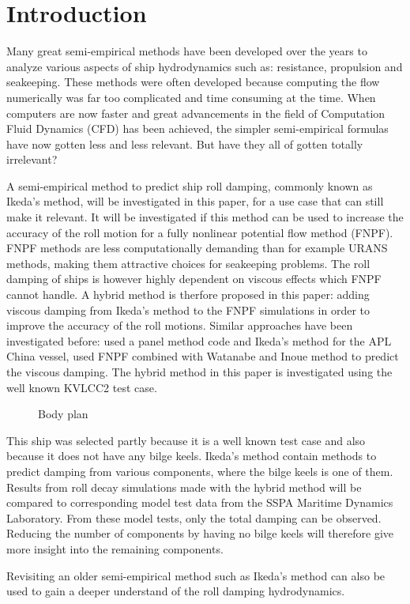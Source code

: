 \section{Introduction}\label{introduction}

Many great semi-empirical methods have been developed over the years to
analyze various aspects of ship hydrodynamics such as: resistance,
propulsion and seakeeping. These methods were often developed because
computing the flow numerically was far too complicated and time
consuming at the time. When computers are now faster and great
advancements in the field of Computation Fluid Dynamics (CFD) has been
achieved, the simpler semi-empirical formulas have now gotten less and
less relevant. But have they all of gotten totally irrelevant?

A semi-empirical method to predict ship roll damping, commonly known as
Ikeda's method, will be investigated in this paper, for a use case that
can still make it relevant. It will be investigated if this method can
be used to increase the accuracy of the roll motion for a fully
nonlinear potential flow method (FNPF). FNPF methods are less
computationally demanding than for example URANS methods, making them
attractive choices for seakeeping problems. The roll damping of ships is
however highly dependent on viscous effects which FNPF cannot handle. A
hybrid method is therfore proposed in this paper: adding viscous damping
from Ikeda's method to the FNPF simulations in order to improve the
accuracy of the roll motions. Similar approaches have been investigated
before: \cite{7505983/UGK6YEVD} used a panel method code and Ikeda's
method for the APL China vessel, \cite{7505983/24TNAV5Z} used FNPF
combined with Watanabe and Inoue method to predict the viscous damping.
The hybrid method in this paper is investigated using the well known
KVLCC2 test case.
 
            
    
    \begin{figure}
        \begin{center}\end{center}
        \caption{Body plan}
        \label{fig:body_plan}
    \end{figure}
    

    This ship was selected partly because it is a well known test case and
also because it does not have any bilge keels. Ikeda's method contain
methods to predict damping from various components, where the bilge
keels is one of them. Results from roll decay simulations made with the
hybrid method will be compared to corresponding model test data from the
SSPA Maritime Dynamics Laboratory. From these model tests, only the
total damping can be observed. Reducing the number of components by
having no bilge keels will therefore give more insight into the
remaining components.

Revisiting an older semi-empirical method such as Ikeda's method can
also be used to gain a deeper understand of the roll damping
hydrodynamics.

    
